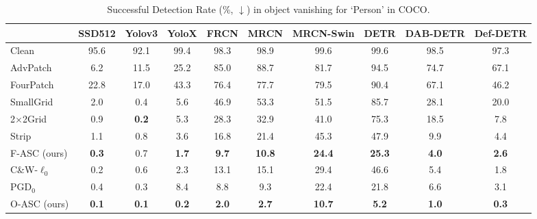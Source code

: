 \documentclass[times,twocolumn,final,authoryear]{elsarticle}
\begin{document}
\begin{table*}[!h]
\centering
\caption{Successful Detection Rate (\%, $\downarrow$) in object vanishing for `Person' in COCO. 
}
\begin{tabular}{l|ccccccccc}
\hline
                & SSD512    & Yolov3    & YoloX     & FRCN      & MRCN      & MRCN-Swin     & DETR      &  DAB-DETR     & Def-DETR          \\ \hline
\hline  
Clean           & 95.6      & 92.1      &  99.4     & 98.3      & 98.9      &   99.6        & 99.6      &   98.5        &   97.3           \\
\hline  
AdvPatch        & 6.2       & 11.5      &   25.2    & 85.0      & 88.7      &   81.7        & 94.5      &  74.7         &       67.1        \\
FourPatch       & 22.8      & 17.0      &    43.3   & 76.4      & 77.7      &   79.5        & 90.4      &  67.1         &       46.2        \\
SmallGrid       & 2.0       & 0.4       &    5.6    & 46.9      & 53.3      &   51.5        & 85.7      &    28.1       &   20.0            \\ 
2$\times$2Grid  & 0.9       &  \bf{0.2} &     5.3   & 28.3      & 32.9      &     41.0      & 75.3      &    18.5       &    7.8             \\
Strip           & 1.1       & 0.8       &   3.6     & 16.8      & 21.4      &   45.3        & 47.9      &  9.9          &    4.4            \\ 
F-ASC (ours)    & \bf{0.3}  & 0.7       &  \bf{1.7} & \bf{9.7}  & \bf{10.8} &   \bf{24.4}   & \bf{25.3} &  \bf{4.0}     &    \bf{2.6}            \\ \hline \hline
C\&W-$\ell_0$   & 0.2       & 0.6       &  2.3      & 13.1      & 15.1      &    29.4       & 46.6      &   5.4         &       1.8            \\ 
PGD$_0$         & 0.4       & 0.3       &   8.4     & 8.8       & 9.3       &   22.4        & 21.8      &   6.6         &    3.1               \\
O-ASC  (ours)   & \bf{0.1}  & \bf{0.1}  &   \bf{0.2}& \bf{2.0}  & \bf{2.7}  &   \bf{10.7}   &\bf{5.2}   &   \bf{1.0}    &   \bf{0.3}                \\ \hline
\end{tabular}
\label{tab:disappear_person}

\end{table*}
\end{document}

